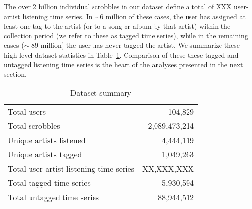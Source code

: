 The over 2 billion individual scrobbles in our dataset define a total of XXX user-artist listening time series. In $\sim 6$ million of these cases, the user has assigned at least one tag to the artist (or to a song or album by that artist) within the collection period (we refer to these as tagged time series), while in the remaining cases ($\sim$ 89 million) the user has never tagged the artist. We summarize these high level dataset statistics in Table~\ref{tab:data_summary}. Comparison of these these tagged and untagged listening time series is the heart of the analyses presented in the next section.

\begin{table}[h]
\begin{center}
\begin{tabular}{l|r}
\toprule
Total users & 104,829 \\
Total scrobbles & 2,089,473,214 \\
Unique artists listened & 4,444,119 \\
Unique artists tagged & 1,049,263 \\
\midrule
Total user-artist listening time series & XX,XXX,XXX \\
Total tagged time series & 5,930,594 \\
Total untagged time series & 88,944,512 \\
\bottomrule
\end{tabular}
\end{center}
\caption{Dataset summary}
\label{tab:data_summary}
\end{table}

